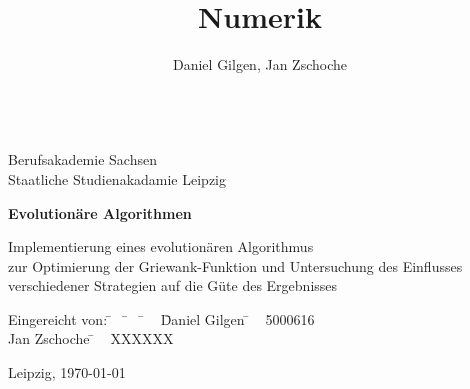\documentclass[12pt,
    a4paper,
    headinclude,
    footinclude]{scrartcl}
\author{Daniel Gilgen, Jan Zschoche}
\title{Numerik}
\begin{document}
	\onehalfspacing
	\monthyearsepgerman{\,}{\,}
	\setcounter{tocdepth}{2}
	
	\begin{titlepage}
	
		\begin{center}
			~\\[0.0cm]
			Berufsakademie Sachsen \\
			Staatliche Studienakadamie Leipzig \\[5cm]
			
			\begin{huge}
				\textbf{Evolutionäre Algorithmen} \\[2cm]
			\end{huge}
			
			\doublespacing
			
			Implementierung eines evolutionären Algorithmus \\
			zur Optimierung der Griewank-Funktion und Untersuchung des Einflusses\\
			 verschiedener Strategien auf die Güte des Ergebnisses\\[3.0cm]
		\end{center}
		
		\onehalfspacing
		\begin{tabbing}
			Eingereicht von: \= ~ \= ~ \= ~ \= Daniel Gilgen \= ~ 5000616\\
			\> \> \> \> Jan Zschoche \= ~ XXXXXX\\
		\end{tabbing}
		\vspace*{\fill}
		Leipzig, \today
		
	\end{titlepage}
    
    \setcounter{page}{1}
    
	
\end{document}
